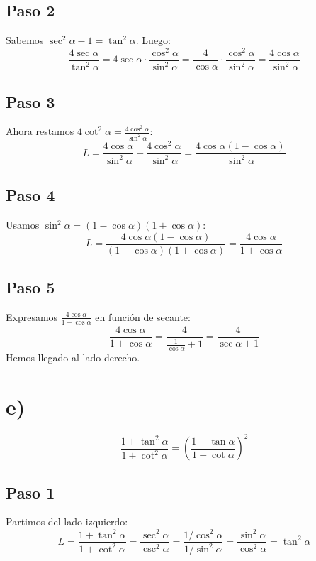 \documentclass[12pt,a4paper]{article}
\begin{document}
\subsection*{Paso 2}
Sabemos \(\sec^2\alpha-1 = \tan^2\alpha\). Luego:
\[
\frac{4\sec\alpha}{\tan^2\alpha} = 4\sec\alpha \cdot \frac{\cos^2\alpha}{\sin^2\alpha}
= \frac{4}{\cos\alpha} \cdot \frac{\cos^2\alpha}{\sin^2\alpha}
= \frac{4\cos\alpha}{\sin^2\alpha}
\]

\subsection*{Paso 3}
Ahora restamos \(4\cot^2\alpha = \frac{4\cos^2\alpha}{\sin^2\alpha}\):
\[
L = \frac{4\cos\alpha}{\sin^2\alpha} - \frac{4\cos^2\alpha}{\sin^2\alpha}
= \frac{4\cos\alpha(1-\cos\alpha)}{\sin^2\alpha}
\]

\subsection*{Paso 4}
Usamos \(\sin^2\alpha = (1-\cos\alpha)(1+\cos\alpha)\):
\[
L = \frac{4\cos\alpha(1-\cos\alpha)}{(1-\cos\alpha)(1+\cos\alpha)}
= \frac{4\cos\alpha}{1+\cos\alpha}
\]

\subsection*{Paso 5}
Expresamos \(\frac{4\cos\alpha}{1+\cos\alpha}\) en función de secante:
\[
\frac{4\cos\alpha}{1+\cos\alpha}
= \frac{4}{ \frac{1}{\cos\alpha} + 1}
= \frac{4}{\sec\alpha+1}
\]
Hemos llegado al lado derecho.

\newpage
\section*{e)}

\begin{identidad}
\[
\frac{1+\tan^2\alpha}
{1+\cot^2\alpha}
=
\left(
\frac{1-\tan\alpha}
{1-\cot\alpha}
\right)^2
\]
\end{identidad}

\subsection*{Paso 1}
Partimos del lado izquierdo:
\[
L = \frac{1+\tan^2\alpha}{1+\cot^2\alpha}
= \frac{\sec^2\alpha}{\csc^2\alpha}
= \frac{1/\cos^2\alpha}{1/\sin^2\alpha}
= \frac{\sin^2\alpha}{\cos^2\alpha}
= \tan^2\alpha
\]
\end{document}
